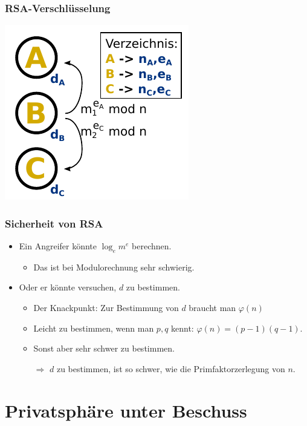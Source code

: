 \documentclass{beamer}
\begin{document}
\begin{frame}
\frametitle{RSA-Verschlüsselung}

	\begin{center}
	\includegraphics[height=0.8\textheight]{images/rsa.pdf}
	\end{center}
\end{frame}

\begin{frame}
\frametitle{Sicherheit von RSA}

\begin{itemize}
	\item Ein Angreifer könnte \(\log_e m^e\) berechnen.
	\begin{itemize}
	\item Das ist bei Modulorechnung sehr schwierig.
	\end{itemize}
\pause	\item Oder er könnte versuchen, \(d\) zu bestimmen.
	\begin{itemize}
	\item Der Knackpunkt: Zur Bestimmung von \(d\) braucht man \(\varphi(n)\)
	\item Leicht zu bestimmen, wenn man \(p,q\) kennt: \(\varphi(n)=(p-1)(q-1)\).
	\item Sonst aber sehr schwer zu bestimmen.
	\item[\(\Rightarrow\)] \(d\) zu bestimmen, ist so schwer, wie die Primfaktorzerlegung von \(n\).
	\end{itemize}
\end{itemize}
\end{frame}

\section{Privatsphäre unter Beschuss}
\end{document}

